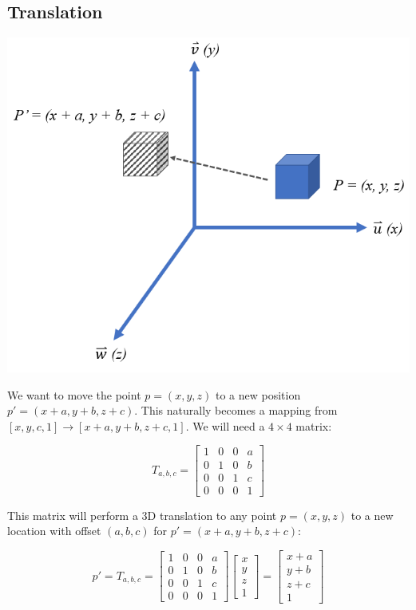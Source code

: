 \documentclass[12pt,letterpaper]{article}
\begin{document}
\subsection{Translation}
\begin{center}
\includegraphics[scale=0.75]{translation}
\end{center}
We want to move the point $p = (x, y, z)$ to a new position $p' = (x+a, y+b, z+c)$. This naturally becomes a mapping from $[x, y, c, 1] \rightarrow [x+a, y+b, z+c, 1]$. We will need a $4 \times 4$ matrix:

\begin{equation}
    T_{a, b, c} = \begin{bmatrix}
        1 & 0 & 0 & a \\
        0 & 1 & 0 & b \\
        0 & 0 & 1 & c \\
        0 & 0 & 0 & 1
    \end{bmatrix}
\end{equation}

This matrix will perform a 3D translation to any point $p = (x, y, z)$ to a new location with offset $(a, b, c)$ for $p' = (x+a, y+b, z+c)$:

\begin{equation}
    p' = T_{a, b, c} = \begin{bmatrix}
        1 & 0 & 0 & a \\
        0 & 1 & 0 & b \\
        0 & 0 & 1 & c \\
        0 & 0 & 0 & 1
    \end{bmatrix}
    \begin{bmatrix}
        x \\
        y \\
        z \\
        1
    \end{bmatrix}
    = \begin{bmatrix}
        x+a \\
        y+b \\
        z+c \\
        1
    \end{bmatrix}
\end{equation}
\end{document}
